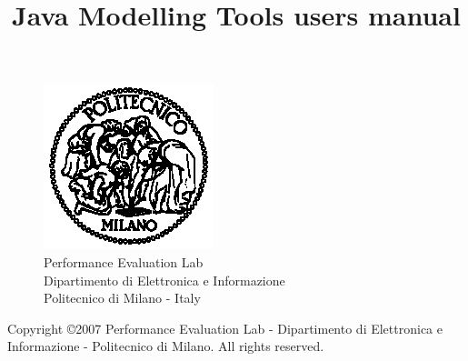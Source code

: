 \documentclass[10pt, twoside, a4paper]{book}
\title{Java Modelling Tools users manual}
\begin{document}
\pagestyle{headings}  \setcounter{page}{-1}

\begin{titlepage}
\begin{figure}[h]
\begin{center}
\includegraphics{img/poli.eps}\\
Performance Evaluation Lab\\
Dipartimento di Elettronica e Informazione\\
Politecnico di Milano - Italy
\end{center}
\end{figure}
\newlength{\centeroffset}
\setlength{\centeroffset}{-0.5\oddsidemargin}
\addtolength{\centeroffset}{0.5\evensidemargin}

\noindent\hspace*{\centeroffset}

\noindent\hspace*{\centeroffset}




\pagebreak
\begin{small}
  Copyright \copyright 2007 Performance Evaluation Lab - Dipartimento
  di Elettronica e Informazione - Politecnico di Milano.
  All rights reserved.


\end{small}
\end{titlepage}
\end{document}

